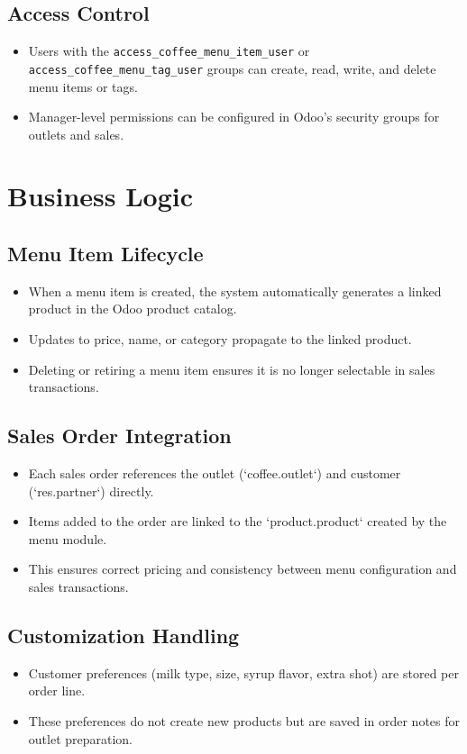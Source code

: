 \subsection*{Access Control}
\begin{itemize}
    \item Users with the \texttt{access\_coffee\_menu\_item\_user} or \texttt{access\_coffee\_menu\_tag\_user} groups can create, read, write, and delete menu items or tags.
    \item Manager-level permissions can be configured in Odoo's security groups for outlets and sales.
\end{itemize}



\section*{Business Logic}

\subsection*{Menu Item Lifecycle}
\begin{itemize}
    \item When a menu item is created, the system automatically generates a linked product in the Odoo product catalog.
    \item Updates to price, name, or category propagate to the linked product.
    \item Deleting or retiring a menu item ensures it is no longer selectable in sales transactions.
\end{itemize}

\subsection*{Sales Order Integration}
\begin{itemize}
    \item Each sales order references the outlet (`coffee.outlet`) and customer (`res.partner`) directly.
    \item Items added to the order are linked to the `product.product` created by the menu module.
    \item This ensures correct pricing and consistency between menu configuration and sales transactions.
\end{itemize}

\subsection*{Customization Handling}
\begin{itemize}
    \item Customer preferences (milk type, size, syrup flavor, extra shot) are stored per order line.
    \item These preferences do not create new products but are saved in order notes for outlet preparation.
\end{itemize}

